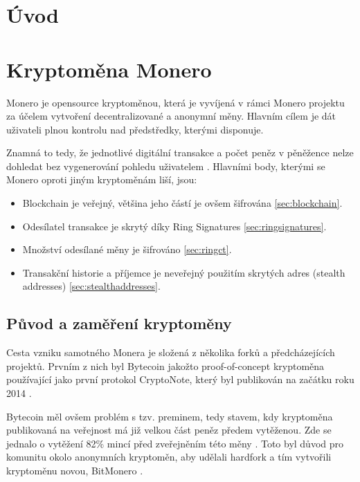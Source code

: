\documentclass[
  printed, %
  table,   %
  nolof,     %
  nolot,     %
           oneside, color
]{fithesis3}
\begin{document}
\chapter{Úvod}
\chapter{Kryptoměna Monero}
Monero je opensource kryptoměnou, která je vyvíjená v rámci Monero projektu za účelem vytvoření decentralizované a anonymní měny. Hlavním cílem je dát uživateli plnou kontrolu nad předstředky, kterými disponuje. 

Znamná to tedy, že jednotlivé digitální transakce a počet peněz v pěněžence nelze dohledat bez vygenerování pohledu uživatelem \cite{moneroprojectgithub}. Hlavními body, kterými se Monero oproti jiným kryptoměnám liší, jsou:
\begin{itemize}\itemsep0em
\item Blockchain je veřejný, většina jeho částí je ovšem šifrována \ref{sec:blockchain}.
\item Odesílatel transakce je skrytý díky Ring Signatures \ref{sec:ringsignatures}.
\item Množství odesílané měny je šifrováno \ref{sec:ringct}.
\item Transakční historie a příjemce je neveřejný použitím skrytých adres (stealth addresses) \ref{sec:stealthaddresses}.
\end{itemize}
\section{Původ a zaměření kryptoměny}
Cesta vzniku samotného Monera je složená z několika forků a předcházejících projektů. Prvním z nich byl Bytecoin jakožto proof-of-concept kryptoměna používající jako první protokol CryptoNote, který byl publikován na začátku roku 2014 \cite{githubbytecoin}.

Bytecoin měl ovšem problém s tzv. preminem, tedy stavem, kdy kryptoměna publikovaná na veřejnost má již velkou část peněz předem vytěženou. Zde se jednalo o vytěžení 82\% mincí před zveřejněním této měny \cite{fluffyponyonbytecoin}.
Toto byl důvod pro komunitu okolo anonymních kryptoměn, aby udělali hardfork a tím vytvořili kryptoměnu novou, BitMonero \cite{bitmonero}.
\end{document}
